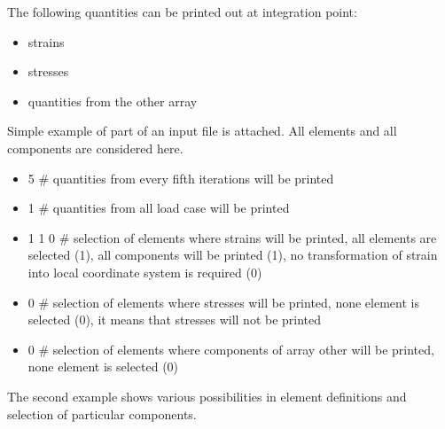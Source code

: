 The following quantities can be printed out at integration point:
\begin{itemize}
\item strains
\item stresses
\item quantities from the other array
\end{itemize}

Simple example of part of an input file is attached. All elements and all components
are considered here. 

\begin{itemize}
\item[]
5 \# quantities from every fifth iterations will be printed
\item[]
1 \# quantities from all load case will be printed
\item[]
1 1 0 \# selection of elements where strains will be printed, all elements are selected (1),
all components will be printed (1), no transformation of strain into
local coordinate system is required (0)
\item[]
0 \# selection of elements where stresses will be printed, none element is selected (0), it means that stresses
will not be printed
\item[]
0 \# selection of elements where components of array other will be printed, none element is selected (0)
\end{itemize}


The second example shows various possibilities in element definitions and selection of particular components.


